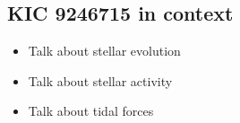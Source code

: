 \subsection{KIC 9246715 in context}\label{results}
\begin{itemize}
\item Talk about stellar evolution
\item Talk about stellar activity
\item Talk about tidal forces
\end{itemize}
